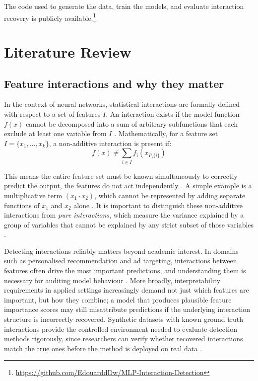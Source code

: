 \documentclass{article}
\begin{document}
The code used to generate the data, train the models, and evaluate interaction recovery is publicly available.\footnote{\url{https://github.com/EdouarddDw/MLP-Interaction-Detection}}



\section{Literature Review}
\label{sec:lit_review}

\subsection{Feature interactions and why they matter}

In the context of neural networks, statistical interactions are formally defined with respect to a set of features \(I\). An interaction exists if the model function \(f(x)\) cannot be decomposed into a sum of arbitrary subfunctions that each exclude at least one variable from \(I\)
\citep{enouen2023sparseinteractionadditivenetworks, tsang2020featureinteractioninterpretabilitycase}. Mathematically, for a feature set \(I = \{x_1, \dots, x_k\}\), a non-additive interaction is present if:
\begin{equation}
f(x) \neq \sum_{i \in I} f_i(x_{I \setminus \{i\}})
\end{equation}

This means the entire feature set must be known simultaneously to correctly predict the output, the features do not act independently \citep{enouen2023sparseinteractionadditivenetworks}. A simple example is a multiplicative term \((x_1 \cdot x_2)\), which cannot be represented by adding separate functions of \(x_1\) and \(x_2\) alone \citep{tsang2020featureinteractioninterpretabilitycase}. It is important to distinguish these non-additive interactions from \textit{pure interactions}, which measure the variance explained by a group of variables that cannot be explained by any strict subset of those variables \citep{lengerich2021dropoutregularizerinteractioneffects}.

Detecting interactions reliably matters beyond academic interest. In domains such as personalised recommendation and ad targeting, interactions between features often drive the most important predictions, and understanding them is necessary for auditing model behaviour \citep{tsang2020featureinteractioninterpretabilitycase}. More broadly, interpretability requirements in applied settings increasingly demand not just which features are important, but how they combine; a model that produces plausible feature importance scores may still misattribute predictions if the underlying interaction structure is incorrectly recovered. Synthetic datasets with known ground truth interactions provide the controlled environment needed to evaluate detection methods rigorously, since researchers can verify whether recovered interactions match the true ones before the method is deployed on real data \citep{agarwal2024openxaitransparentevaluationmodel, wong2021reallytrustyousimple}.
\end{document}
